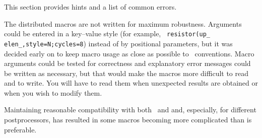 This section provides hints and a list of common errors.

The distributed macros are not written for maximum robustness.
Arguments could be entered in a key--value style (for example, {\tt
resistor(up\_ elen\_,style=N;cycles=8}) instead of by positional
parameters, but it was decided early on
to keep macro usage as close as possible to \pic\ conventions.
Macro arguments could be tested for correctness and
explanatory error messages could be written as necessary, but that
would make the macros more difficult to read and to write.  You will
have to read them when unexpected results are obtained or when you wish
to modify them.

Maintaining reasonable compatibility with both \gpic\ and \dpic
and, especially, for different postprocessors, has
resulted in some macros becoming more complicated than is preferable.


